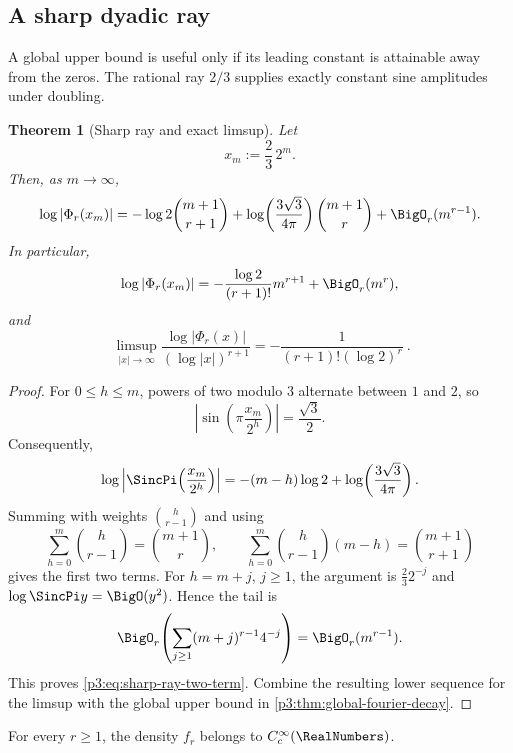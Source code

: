 \documentclass[11pt,oneside]{article}
\newtheorem{theorem}{Theorem}[section]
\theoremstyle{definition}
\theoremstyle{remark}
\begin{document}
\subsection{A sharp dyadic ray}

A global upper bound is useful only if its leading constant is attainable away from the zeros.  The rational ray $2/3$ supplies exactly constant sine amplitudes under doubling.

\begin{theorem}[Sharp ray and exact limsup]\label{p3:thm:sharp-ray}
Let
\begin{equation}\label{p3:eq:sharp-ray}
  x_m:=\frac23\,2^m.
\end{equation}
Then, as $m\to\infty$,
\begin{equation}\label{p3:eq:sharp-ray-two-term}
 \log|\Phi_r(x_m)|
 =-\log2\binom{m+1}{r+1}
 +\log\!\left(\frac{3\sqrt3}{4\pi}\right)
  \binom{m+1}{r}
 +\BigO_r(m^{r-1}).
\end{equation}
In particular,
\begin{equation}\label{p3:eq:sharp-ray-leading}
 \log|\Phi_r(x_m)|
 =-\frac{\log2}{(r+1)!}m^{r+1}+\BigO_r(m^r),
\end{equation}
and
\begin{equation}\label{p3:eq:fourier-limsup}
 \boxed{\ 
 \limsup_{|x|\to\infty}
 \frac{\log|\Phi_r(x)|}{(\log|x|)^{r+1}}
 =-\frac1{(r+1)!(\log2)^r}
 \ }.
\end{equation}
\end{theorem}

\begin{proof}
For $0\le h\le m$, powers of two modulo $3$ alternate between $1$ and $2$, so
\[
 \left|\sin\!\left(\pi\frac{x_m}{2^h}\right)\right|
 =\frac{\sqrt3}{2}.
\]
Consequently,
\[
 \log\left|\SincPi\!\left(\frac{x_m}{2^h}\right)\right|
 =-(m-h)\log2+\log\!\left(\frac{3\sqrt3}{4\pi}\right).
\]
Summing with weights $\binom h{r-1}$ and using
\[
 \sum_{h=0}^{m}\binom h{r-1}=\binom{m+1}{r},
 \qquad
 \sum_{h=0}^{m}\binom h{r-1}(m-h)=\binom{m+1}{r+1}
\]
gives the first two terms.  For $h=m+j$, $j\ge1$, the argument is $\frac23 2^{-j}$ and
$\log\SincPi y=\BigO(y^2)$.  Hence the tail is
\[
 \BigO_r\!\left(\sum_{j\ge1}(m+j)^{r-1}4^{-j}\right)
 =\BigO_r(m^{r-1}).
\]
This proves \eqref{p3:eq:sharp-ray-two-term}.  Combine the resulting lower sequence for the limsup with the global upper bound in \cref{p3:thm:global-fourier-decay}.
\end{proof}

\begin{corollary}\label{p3:cor:smooth-density}
For every $r\ge1$, the density $f_r$ belongs to $C_c^\infty(\RealNumbers)$.
\end{corollary}
\end{document}
